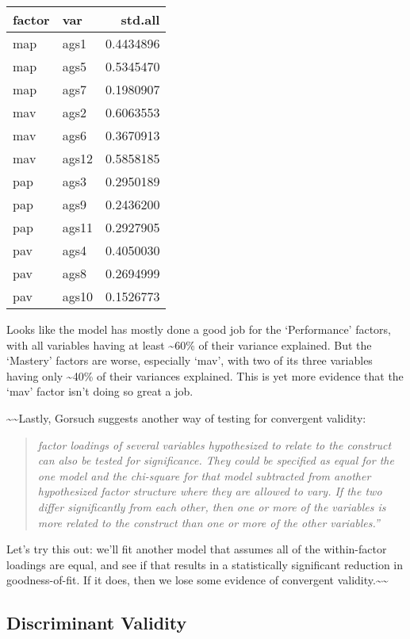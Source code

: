 \documentclass[
  letterpaper,
  DIV=11,
  numbers=noendperiod]{scrreprt}
\begin{document}
\begin{longtable}[]{@{}llr@{}}
\toprule()
factor & var & std.all \\
\midrule()
\endhead
map & ags1 & 0.4434896 \\
map & ags5 & 0.5345470 \\
map & ags7 & 0.1980907 \\
mav & ags2 & 0.6063553 \\
mav & ags6 & 0.3670913 \\
mav & ags12 & 0.5858185 \\
pap & ags3 & 0.2950189 \\
pap & ags9 & 0.2436200 \\
pap & ags11 & 0.2927905 \\
pav & ags4 & 0.4050030 \\
pav & ags8 & 0.2694999 \\
pav & ags10 & 0.1526773 \\
\bottomrule()
\end{longtable}

Looks like the model has mostly done a good job for the `Performance'
factors, with all variables having at least \textasciitilde60\% of their
variance explained. But the `Mastery' factors are worse, especially
`mav', with two of its three variables having only \textasciitilde40\%
of their variances explained. This is yet more evidence that the `mav'
factor isn't doing so great a job.

\textasciitilde\textasciitilde Lastly, Gorsuch suggests another way of
testing for convergent validity:

\begin{quote}
\emph{factor loadings of several variables hypothesized to relate to the
construct can also be tested for significance. They could be specified
as equal for the one model and the chi-square for that model subtracted
from another hypothesized factor structure where they are allowed to
vary. If the two differ significantly from each other, then one or more
of the variables is more related to the construct than one or more of
the other variables.''}
\end{quote}

Let's try this out: we'll fit another model that assumes all of the
within-factor loadings are equal, and see if that results in a
statistically significant reduction in goodness-of-fit. If it does, then
we lose some evidence of convergent
validity.\textasciitilde\textasciitilde{}

\hypertarget{discriminant-validity}{%
\subsection{Discriminant Validity}\label{discriminant-validity}}
\end{document}
